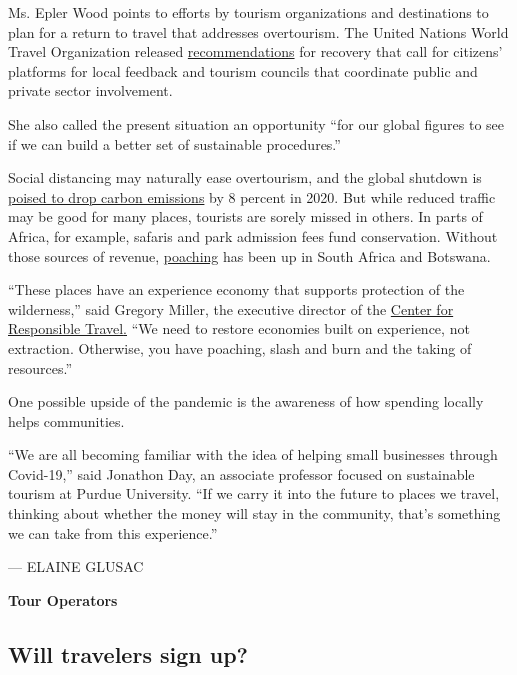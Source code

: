 Ms. Epler Wood points to efforts by tourism organizations and
destinations to plan for a return to travel that addresses overtourism.
The United Nations World Travel Organization released
\href{https://webunwto.s3.eu-west-1.amazonaws.com/s3fs-public/2020-04/COVID19_Recommendations_English_1.pdf}{recommendations}
for recovery that call for citizens' platforms for local feedback and
tourism councils that coordinate public and private sector involvement.

She also called the present situation an opportunity ``for our global
figures to see if we can build a better set of sustainable procedures.''

Social distancing may naturally ease overtourism, and the global
shutdown is
\href{https://www.nytimes3xbfgragh.onion/2020/04/30/climate/global-emissions-decline.html}{poised
to drop carbon emissions} by 8 percent in 2020. But while reduced
traffic may be good for many places, tourists are sorely missed in
others. In parts of Africa, for example, safaris and park admission fees
fund conservation. Without those sources of revenue,
\href{https://www.nytimes3xbfgragh.onion/2020/04/08/science/coronavirus-poaching-rhinos.html}{poaching}
has been up in South Africa and Botswana.

``These places have an experience economy that supports protection of
the wilderness,'' said Gregory Miller, the executive director of the
\href{https://www.responsibletravel.org/}{Center for Responsible
Travel}\href{https://www.responsibletravel.org/}{.} ``We need to restore
economies built on experience, not extraction. Otherwise, you have
poaching, slash and burn and the taking of resources.''

One possible upside of the pandemic is the awareness of how spending
locally helps communities.

``We are all becoming familiar with the idea of helping small businesses
through Covid-19,'' said Jonathon Day, an associate professor focused on
sustainable tourism at Purdue University. ``If we carry it into the
future to places we travel, thinking about whether the money will stay
in the community, that's something we can take from this experience.''

--- ELAINE GLUSAC

\textbf{Tour Operators}

\hypertarget{will-travelers-sign-up}{%
\subsection{Will travelers sign up?}\label{will-travelers-sign-up}}

